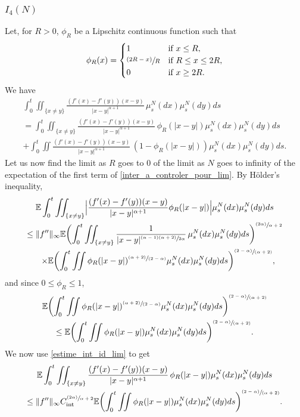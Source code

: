 \documentclass[JEP,XML,SOM,Unicode,published]{cedram}
\newcommand{\psfrac}[2]{\sfrac{(#1)}{#2}}
\newcommand{\pspfrac}[2]{\sfrac{(#1)}{(#2)}}
\newcommand{\rint}{\mathrm{int}}
\theoremstyle{plain}
\theoremstyle{definition}
\begin{document}
\subsubsection*{$I_4(N)$} Let, for $R>0$, $\phi_R$ be a Lipschitz continuous function such that
\begin{align*}
\phi_R(x)=\begin{cases}
1&\text{if }x\leq R,\\\psfrac{2R-x}{R}&\text{if }R\leq x\leq 2R,\\
0&\text{if }x\geq 2R. \end{cases}
\end{align*}
We have
\begin{multline}\label{inter_a_controler_pour_lim}
\int_{0}^t\iint_{\{x\neq y\}}\frac{(f'(x)-f'(y))(x-y)}{|x-y|^{\alpha+1}}\,\mu^N_s(dx)\mu^N_s(dy)ds\\
=\int_{0}^t\iint_{\{x\neq y\}}\frac{(f'(x)-f'(y))(x-y)}{|x-y|^{\alpha+1}}\,\phi_R(|x-y|)\mu^N_s(dx)\mu^N_s(dy)ds\\
+\int_{0}^t\iint\frac{(f'(x)-f'(y))(x-y)}{|x-y|^{\alpha+1}}\,(1-\phi_R(|x-y|))\mu^N_s(dx)\mu^N_s(dy)ds.
\end{multline}
Let us now find the limit as $R$ goes to 0 of the limit as $N$ goes to infinity of the expectation of the first term of \eqref{inter_a_controler_pour_lim}. By Hölder's inequality,
\begin{multline*}
\mathbb{E}\int_{0}^t\iint_{\{x\neq y\}}\Bigl|\frac{(f'(x)-f'(y))(x-y)}{|x-y|^{\alpha+1}}\phi_R(|x-y|)\Bigr|\mu^N_s(dx)\mu^N_s(dy)ds\\
\leq \|f''\|_\infty\mathbb{E}\biggl(\int_{0}^t\iint_{\{x\neq y\}}\frac{1}{|x-y|^{\sfrac{(\alpha-1)(\alpha+2)}{2\alpha}}}\,\mu^N_s(dx)\mu^N_s(dy)ds\biggr)^{\psfrac{2\alpha}{\alpha+2}}\\
\hspace{0.3cm}\times\mathbb{E}\biggl(\int_{0}^t\iint\phi_R(|x-y|)^{\pspfrac{\alpha+2}{2-\alpha}}\mu^N_s(dx)\mu^N_s(dy)ds\biggr)^{\pspfrac{2-\alpha}{\alpha+2}},
\end{multline*}
and since $0\leq\phi_R\leq1$,
\begin{multline*}
\mathbb{E}\biggl(\int_{0}^t\iint\phi_R(|x-y|)^{\pspfrac{\alpha+2}{2-\alpha}}\mu^N_s(dx)\mu^N_s(dy)ds\biggr)^{\pspfrac{2-\alpha}{\alpha+2}}
\\
\leq\mathbb{E}\biggl(\int_{0}^t\iint\phi_R(|x-y|)\mu^N_s(dx)\mu^N_s(dy)ds\biggr)^{\pspfrac{2-\alpha}{\alpha+2}}.
\end{multline*}
We now use \eqref{estime_int_id_lim} to get
\begin{multline}\label{inter_a_controler_pour_lim_1}
\mathbb{E}\int_{0}^t\iint_{\{x\neq y\}}\frac{(f'(x)-f'(y))(x-y)}{|x-y|^{\alpha+1}}\,\phi_R(|x-y|)\mu^N_s(dx)\mu^N_s(dy)ds\\
\leq \|f''\|_\infty C_{\rint}^{\psfrac{2\alpha}{\alpha+2}}\mathbb{E}\biggl(\int_{0}^t\iint\phi_R(|x-y|)\mu^N_s(dx)\mu^N_s(dy)ds\biggr)^{\pspfrac{2-\alpha}{\alpha+2}}.
\end{multline}
\end{document}
